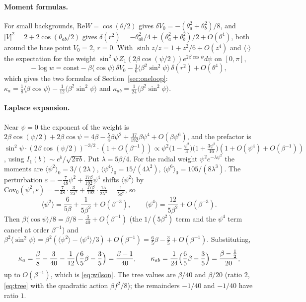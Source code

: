 \documentclass[11pt,a4paper]{article}
\theoremstyle{definition}
\theoremstyle{remark}
\begin{document}
\paragraph{Moment formulas.}
For small backgrounds, $\mathrm{Re}W=\cos(\theta/2)$ gives $\delta V_0=-(\theta_a^2+\theta_b^2)/8$, and $|V|^2=2+2\cos(\theta_{ab}/2)$ gives $\delta(r^2)=-\theta_{ab}^2/4+(\theta_a^2+\theta_b^2)/2+O(\theta^4)$, both around the base point $V_0=2$, $r=0$.
With $\sinh z/z=1+z^2/6+O(z^4)$ and $\langle\cdot\rangle$ the expectation for the weight $\sin^2\psi\,Z_1(2\beta\cos(\psi/2))e^{2\beta\cos\psi}d\psi$ on $[0,\pi]$,
\[
-\log w=\mathrm{const}-\beta\langle\cos\psi\rangle\,\delta V_0-\tfrac16\langle\beta^2\sin^2\psi\rangle\,\delta(r^2)+O(\theta^4),
\]
which gives the two formulas of Section~\ref{sec:oneloop}:
$\kappa_a=\tfrac18\langle\beta\cos\psi\rangle-\tfrac1{12}\langle\beta^2\sin^2\psi\rangle$ and $\kappa_{ab}=\tfrac1{24}\langle\beta^2\sin^2\psi\rangle$.

\paragraph{Laplace expansion.}
Near $\psi=0$ the exponent of the weight is $2\beta\cos(\psi/2)+2\beta\cos\psi=4\beta-\tfrac54\beta\psi^2+\tfrac{17}{192}\beta\psi^4+O(\beta\psi^6)$, and the prefactor is $\sin^2\psi\cdot(2\beta\cos(\psi/2))^{-3/2}\cdot(1+O(\beta^{-1}))\propto\psi^2\bigl(1-\tfrac{\psi^2}3\bigr)\bigl(1+\tfrac{3\psi^2}{16}\bigr)(1+O(\psi^4)+O(\beta^{-1}))$, using $I_1(b)\sim e^b/\sqrt{2\pi b}$.
Put $\lambda=5\beta/4$.
For the radial weight $\psi^2e^{-\lambda\psi^2}$ the moments are $\langle\psi^2\rangle_0=3/(2\lambda)$, $\langle\psi^4\rangle_0=15/(4\lambda^2)$, $\langle\psi^6\rangle_0=105/(8\lambda^3)$.
The perturbation $\varepsilon=-\tfrac7{48}\psi^2+\tfrac{17\beta}{192}\psi^4$ shifts $\langle\psi^2\rangle$ by $\mathrm{Cov}_0(\psi^2,\varepsilon)=-\tfrac7{48}\cdot\tfrac3{2\lambda^2}+\tfrac{17\beta}{192}\cdot\tfrac{15}{2\lambda^3}=\tfrac{1}{5\beta^2}$, so
\[
\langle\psi^2\rangle=\frac6{5\beta}+\frac1{5\beta^2}+O(\beta^{-3}),\qquad \langle\psi^4\rangle=\frac{12}{5\beta^2}+O(\beta^{-3}).
\]
Then $\beta\langle\cos\psi\rangle/8=\beta/8-\tfrac3{40}+O(\beta^{-1})$ (the $1/(5\beta^2)$ term and the $\psi^4$ term cancel at order $\beta^{-1}$) and $\beta^2\langle\sin^2\psi\rangle=\beta^2(\langle\psi^2\rangle-\langle\psi^4\rangle/3)+O(\beta^{-1})=\tfrac65\beta-\tfrac35+O(\beta^{-1})$.
Substituting,
\[
\kappa_a=\frac\beta8-\frac3{40}-\frac1{12}\Bigl(\frac65\beta-\frac35\Bigr)=\frac{\beta-1}{40},\qquad \kappa_{ab}=\frac1{24}\Bigl(\frac65\beta-\frac35\Bigr)=\frac{\beta-\frac12}{20},
\]
up to $O(\beta^{-1})$, which is \eqref{eq:wilson}.
The tree values are $\beta/40$ and $\beta/20$ (ratio $2$, \eqref{eq:tree} with the quadratic action $\beta f^2/8$); the remainders $-1/40$ and $-1/40$ have ratio $1$.
\end{document}
